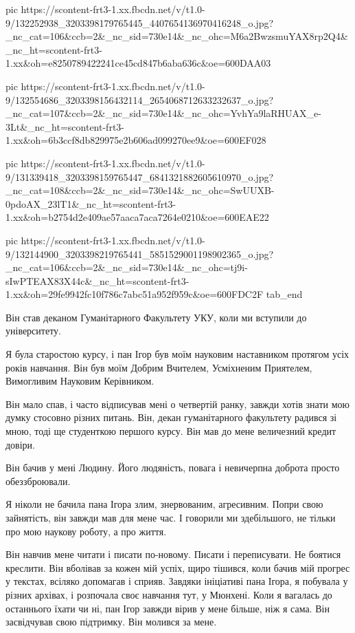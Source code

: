 pic https://scontent-frt3-1.xx.fbcdn.net/v/t1.0-9/132252938_3203398179765445_4407654136970416248_o.jpg?_nc_cat=106&ccb=2&_nc_sid=730e14&_nc_ohc=M6a2BwzsmuYAX8rp2Q4&_nc_ht=scontent-frt3-1.xx&oh=e8250789422241ce45cd847b6aba636c&oe=600DAA03

pic https://scontent-frt3-1.xx.fbcdn.net/v/t1.0-9/132554686_3203398156432114_2654068712633232637_o.jpg?_nc_cat=107&ccb=2&_nc_sid=730e14&_nc_ohc=YvhYa9laRHUAX_e-3Lt&_nc_ht=scontent-frt3-1.xx&oh=6b3ccf8db829975e2b606ad099270ee9&oe=600EF028

pic https://scontent-frt3-1.xx.fbcdn.net/v/t1.0-9/131339418_3203398159765447_6841321882605610970_o.jpg?_nc_cat=108&ccb=2&_nc_sid=730e14&_nc_ohc=SwUUXB-0pdoAX_23lT1&_nc_ht=scontent-frt3-1.xx&oh=b2754d2e409ae57aaca7aca7264e0210&oe=600EAE22

pic https://scontent-frt3-1.xx.fbcdn.net/v/t1.0-9/132144900_3203398219765441_5851529001198902365_o.jpg?_nc_cat=106&ccb=2&_nc_sid=730e14&_nc_ohc=tj9i-sIwPTEAX83X44c&_nc_ht=scontent-frt3-1.xx&oh=29fe9942fc10f786c7abc51a952f959c&oe=600FDC2F
tab_end
\fi

Він став деканом Гуманітарного Факультету УКУ, коли ми вступили до
університету. 

Я була старостою курсу, і пан Ігор був моїм науковим наставником протягом усіх
років навчання. Він був моїм Добрим Вчителем, Усміхненим Приятелем, Вимогливим
Науковим Керівником. 

Він мало спав, і часто відписував мені о четвертій ранку, завжди хотів знати
мою думку стосовно різних питань. Він, декан гуманітарного факультету радився
зі мною, тоді ще студенткою першого курсу. Він мав до мене величезний кредит
довіри.

Він бачив у мені Людину. Його людяність, повага і невичерпна доброта просто
обеззброювали. 

Я ніколи не бачила пана Ігора злим, знервованим, агресивним. Попри свою
зайнятість, він завжди мав для мене час.  І говорили ми здебільшого, не тільки
про мою наукову роботу, а про життя. 

Він навчив мене читати і писати по-новому. Писати і переписувати. Не боятися
креслити. Він вболівав за кожен мій успіх, щиро тішився, коли бачив мій прогрес
у текстах, всіляко допомагав і сприяв. Завдяки ініціативі пана Ігора, я
побувала у різних архівах, і розпочала своє навчання тут, у Мюнхені. Коли я
вагалась до останнього їхати чи ні, пан Ігор завжди вірив у мене більше, ніж я
сама. Він засвідчував свою підтримку. Він молився за мене.

